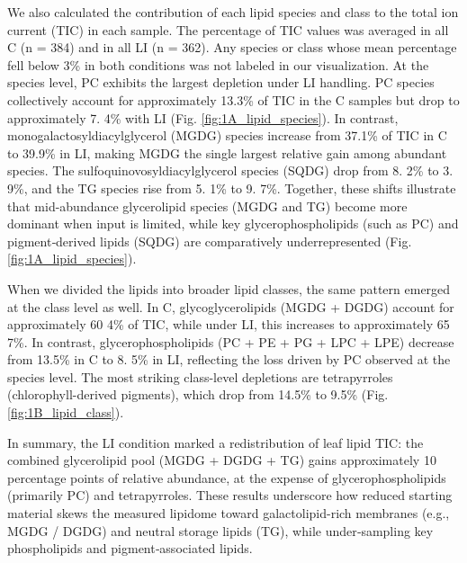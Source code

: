 \documentclass[10pt,letterpaper]{article}
\begin{document}
We also calculated the contribution of each lipid species and class to the total ion current (TIC) in each sample. The percentage of TIC values was averaged in all C (n = 384) and in all LI (n = 362). Any species or class whose mean percentage fell below 3\% in both conditions was not labeled in our visualization. At the species level, PC exhibits the largest depletion under LI handling. PC species collectively account for approximately 13.3\% of TIC in the C samples but drop to approximately 7. 4\% with LI (Fig. \ref{fig:1A_lipid_species}). In contrast, monogalactosyldiacylglycerol (MGDG) species increase from 37.1\% of TIC in C to 39.9\% in LI, making MGDG the single largest relative gain among abundant species. The sulfoquinovosyldiacylglycerol species (SQDG) drop from 8. 2\% to 3. 9\%, and the TG species rise from 5. 1\% to 9. 7\%. Together, these shifts illustrate that mid-abundance glycerolipid species (MGDG and TG) become more dominant when input is limited, while key glycerophospholipids (such as PC) and pigment‐derived lipids (SQDG) are comparatively underrepresented (Fig. \ref{fig:1A_lipid_species}).

When we divided the lipids into broader lipid classes, the same pattern emerged at the class level as well. In C, glycoglycerolipids (MGDG + DGDG) account for approximately 60 4\% of TIC, while under LI, this increases to approximately 65 7\%. In contrast, glycerophospholipids (PC + PE + PG + LPC + LPE) decrease from 13.5\% in C to 8. 5\% in LI, reflecting the loss driven by PC observed at the species level. The most striking class-level depletions are tetrapyrroles (chlorophyll-derived pigments), which drop from 14.5\% to 9.5\% (Fig. \ref{fig:1B_lipid_class}).

In summary, the LI condition marked a redistribution of leaf lipid TIC: the combined glycerolipid pool (MGDG + DGDG + TG) gains approximately 10 percentage points of relative abundance, at the expense of glycerophospholipids (primarily PC) and tetrapyrroles. These results underscore how reduced starting material skews the measured lipidome toward galactolipid-rich membranes (e.g., MGDG / DGDG) and neutral storage lipids (TG), while under‐sampling key phospholipids and pigment‐associated lipids.
\end{document}
